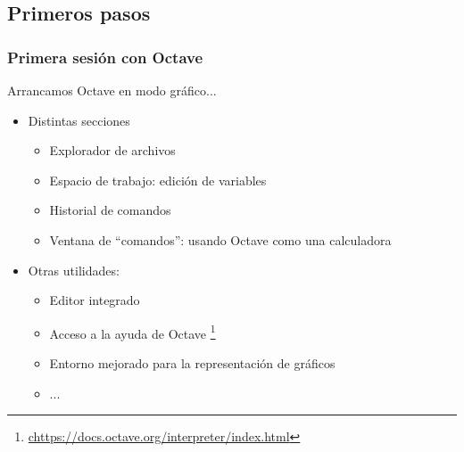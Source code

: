 






\subsection{Primeros pasos}

\hypertarget{primera-sesi-n-con-qtoctave}{}
\begin{frame}
\frametitle{Primera sesión con Octave}
Arrancamos Octave en modo gráfico...
\begin{itemize}

\item {} 
Distintas secciones

\begin{itemize}

\item {} 
  Explorador de archivos

\item {} Espacio de trabajo: edición de variables
\item {} Historial de comandos
\item {} 
 {Ventana de ``comandos''}: usando Octave como una calculadora

\end{itemize}

\item Otras utilidades:
\begin{itemize}
\item Editor integrado
  \item {Acceso a la ayuda de Octave}%
  \footnote{\tiny\url{chttps://docs.octave.org/interpreter/index.html}}
\item Entorno mejorado para la representación de gráficos
\item ...
\end{itemize}

\end{itemize}

\end{frame}



